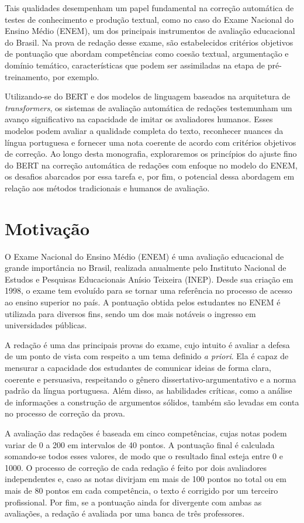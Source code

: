 Tais qualidades desempenham um papel fundamental na correção automática de testes de conhecimento e produção textual, como no caso do Exame Nacional do Ensino Médio (ENEM), um dos principais instrumentos de avaliação educacional do Brasil. Na prova de redação desse exame, são estabelecidos critérios objetivos de pontuação que abordam competências como coesão textual, argumentação e domínio temático, características que podem ser assimiladas na etapa de pré-treinamento, por exemplo.

Utilizando-se do BERT e dos modelos de linguagem baseados na arquitetura de \textit{transformers}, os sistemas de avaliação automática de redações testemunham um avanço significativo na capacidade de imitar os avaliadores humanos. Esses modelos podem avaliar a qualidade completa do texto, reconhecer nuances da língua portuguesa e fornecer uma nota coerente de acordo com critérios objetivos de correção. Ao longo desta monografia, exploraremos os princípios do ajuste fino do BERT na correção automática de redações com enfoque no modelo do ENEM, os desafios abarcados por essa tarefa e, por fim, o potencial dessa abordagem em relação aos métodos tradicionais e humanos de avaliação.

\section{Motivação}

O Exame Nacional do Ensino Médio (ENEM) é uma avaliação educacional de grande importância no Brasil, realizada anualmente pelo Instituto Nacional de Estudos e Pesquisas Educacionais Anísio Teixeira (INEP). Desde sua criação em 1998, o exame tem evoluído para se tornar uma referência no processo de acesso ao ensino superior no país. A pontuação obtida pelos estudantes no ENEM é utilizada para diversos fins, sendo um dos mais notáveis o ingresso em universidades públicas.

A redação é uma das principais provas do exame, cujo intuito é avaliar a defesa de um ponto de vista com respeito a um tema definido \textit{a priori}. Ela é capaz de mensurar a capacidade dos estudantes de comunicar ideias de forma clara, coerente e persuasiva, respeitando o gênero dissertativo-argumentativo e a norma padrão da língua portuguesa. Além disso, as habilidades críticas, como a análise de informações a construção de argumentos sólidos, também são levadas em conta no processo de correção da prova.

A avaliação das redações é baseada em cinco competências, cujas notas podem variar de 0 a 200 em intervalos de 40 pontos. A pontuação final é calculada somando-se todos esses valores, de modo que o resultado final esteja entre 0 e 1000. O processo de correção de cada redação é feito por dois avaliadores independentes e, caso as notas divirjam em mais de 100 pontos no total ou em mais de 80 pontos em cada competência, o texto é corrigido por um terceiro profissional. Por fim, se a pontuação ainda for divergente com ambas as avaliações, a redação é avaliada por uma banca de três professores.

